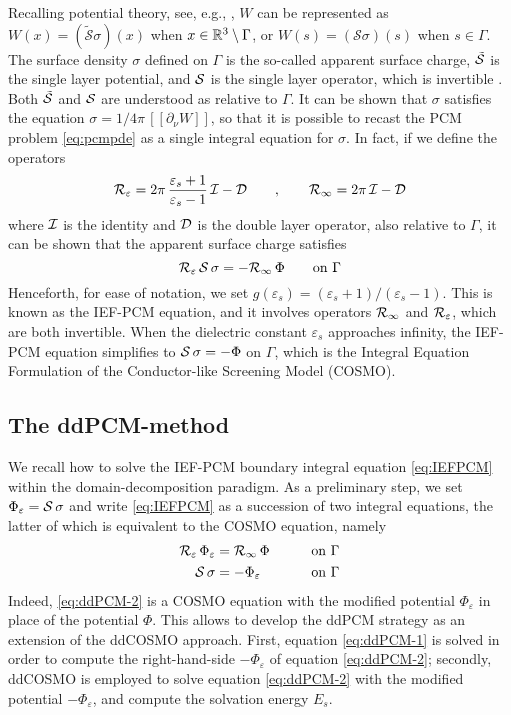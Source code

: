 Recalling potential theory, see, e.g., \cite{sauter2010boundary}, $W$ can be represented as $W(x) = (\tilde{\mathcal{S}}\sigma)(x)$ when $x \in \mathbb{R}^3 \setminus \Gamma$, or $W(s) = (\mathcal{S}\sigma)(s)$ when $s \in \Gamma$. 
The surface density $\sigma$ defined on $\Gamma$ is the so-called apparent surface charge,  $\tilde{\mathcal{S}}$ is the single layer potential, and $\mathcal{S}$ is the single layer operator,  which is invertible \cite{Calderon}. Both $\tilde{\mathcal{S}}$ and $\mathcal{S}$ are understood as relative to $\Gamma$.
It can be shown that $\sigma$ satisfies the equation $\sigma = 1/4\pi \, [\![ \partial_\nu W]\!]$, so that it is possible to recast the PCM problem \eqref{eq:pcmpde} as a single integral equation for $\sigma$. In fact, if we define the operators 
\begin{equation}
 \label{eq:Reps}
 \mathcal{R}_\varepsilon = 2\pi \, \frac{\varepsilon_s+1}{\varepsilon_s-1} \, \mathcal{I} - \mathcal{D} \qquad, \qquad \mathcal{R}_\infty = 2\pi \, \mathcal{I} - \mathcal{D}
\end{equation}
where $\mathcal{I}$ is the identity and $\mathcal{D}$ is the double layer operator, also relative to $\Gamma$, it can be shown\cite{ReviewPCM_2005} that the apparent surface charge satisfies
\begin{equation}
\label{eq:IEFPCM}
\mathcal{R}_\varepsilon \, \mathcal{S} \, \sigma = - \mathcal{R}_\infty \, \Phi \qquad \text{on }\Gamma
\end{equation}
Henceforth, for ease of notation, we set $g(\varepsilon_s) = (\varepsilon_s+1)/(\varepsilon_s-1)$.
This is known as the IEF-PCM equation, and it involves operators $\mathcal{R}_\infty$ and $\mathcal{R}_\varepsilon$, which are both invertible. When the dielectric constant $\varepsilon_s$ approaches infinity, the IEF-PCM equation simplifies to $\mathcal{S} \, \sigma = - \Phi$ on $\Gamma$, which is the Integral Equation Formulation of the Conductor-like Screening Model (COSMO)\cite{Lipparini_JCP_VPCM}.


\subsection{The ddPCM-method}


We recall how to solve the IEF-PCM boundary integral equation \eqref{eq:IEFPCM} within the domain-decomposition paradigm. As a preliminary step, we set $\Phi_\varepsilon = \mathcal{S} \, \sigma$ and write \eqref{eq:IEFPCM} as a succession of two integral equations, the latter of which is equivalent to the COSMO equation\cite{Cances_Librone_PCM}, namely
\begin{alignat}{3}
\mathcal{R}_\varepsilon \, \Phi_\varepsilon & = \mathcal{R}_\infty \, \Phi \qquad && \text{on }\Gamma  \label{eq:ddPCM-1} \\
\mathcal{S} \, \sigma & = -\Phi_\varepsilon  && \text{on }\Gamma \label{eq:ddPCM-2} 
\end{alignat}
Indeed, \eqref{eq:ddPCM-2} is a COSMO equation with the modified potential $\Phi_\varepsilon$ in place of the potential $\Phi$. This allows to develop the ddPCM strategy as an extension of the ddCOSMO approach. First, equation \eqref{eq:ddPCM-1} is solved in order to compute the right-hand-side $-\Phi_\varepsilon$ of equation \eqref{eq:ddPCM-2}; secondly, ddCOSMO is employed to solve equation \eqref{eq:ddPCM-2} with the modified potential $-\Phi_\varepsilon$, and compute the solvation energy $E_s$.


